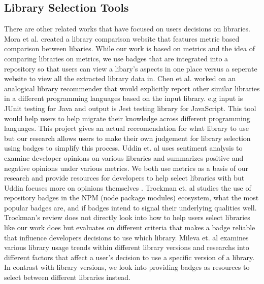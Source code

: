 \documentclass[12pt, letterpaper]{article}
\begin{document}
\subsection{Library Selection Tools}
There are other related works that have focused on users decisions on libraries. 
Mora et al. \cite{metrics, empiricalmetrics} created a library comparison website
that features metric based comparison between libaries. While our work is based on
metrics and the idea of comparing libraries on metrics, we use badges that are integrated into
a repository so that users can view a libary's aspects in one place versus a seperate
website to view all the extracted library data in. 
Chen et al. \cite{analogical} worked on an analogical library recommender that would explicitly
report other similar libraries in a different programming languages based on the input library.
e.g input is JUnit testing for Java and output is Jest testing library for JavaScript. 
This tool would help users to help migrate their knowledge across different programming languages.
This project gives an actual reccomendation for what library to use but our research allows users to
make their own judgement for library selection using badges to simplify this process.
Uddin et. al \cite{opinerarticle} uses sentiment analysis to examine developer opinions on various libraries
and summarizes positive and negative opinions under various metrics. We both use metrics as a basis of
our research and provide resources for developers to help select libraries with but Uddin focuses more on
opinions themselves \cite{stackoverflow}.
Trockman et. al \cite{githubbadges} studies the use of repository badges in the NPM (node package modules)
ecosystem, what the most popular badges are, and if badges intend to signal their underlying qualities well.
Trockman's review does not directly look into how to help users select libraries like our work does but 
evaluates on different criteria that makes a badge reliable that influence developers decisions
to use which library. Mileva et. al \cite{librarytrends} examines various library usage trends 
within different library versions and researchs into different factors that affect a user's decision
to use a specific version of a library. In contrast with library versions, we look into providing badges
as resources to select between different libraries instead.


\end{document}
